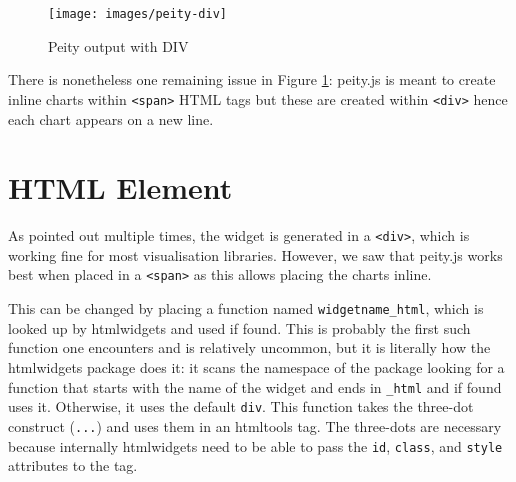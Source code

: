 \documentclass[10pt,]{krantz}
\makeatletter
\newenvironment{Shaded}{\begin{snugshade}}{\end{snugshade}}
\newcommand{\DataTypeTok}[1]{\textcolor[rgb]{0.27,0.27,0.27}{#1}}
\newcommand{\DecValTok}[1]{\textcolor[rgb]{0.06,0.06,0.06}{#1}}
\newcommand{\KeywordTok}[1]{\textcolor[rgb]{0.27,0.27,0.27}{\textbf{#1}}}
\newcommand{\NormalTok}[1]{#1}
\newcommand{\StringTok}[1]{\textcolor[rgb]{0.5,0.5,0.5}{#1}}
\newenvironment{kframe}{%
\medskip{}
\setlength{\fboxsep}{.8em}
 \def\at@end@of@kframe{}%
 \ifinner\ifhmode%
  \def\at@end@of@kframe{\end{minipage}}%
  \begin{minipage}{\columnwidth}%
 \fi\fi%
 \def\FrameCommand##1{\hskip\@totalleftmargin \hskip-\fboxsep
 \colorbox{shadecolor}{##1}\hskip-\fboxsep
     \hskip-\linewidth \hskip-\@totalleftmargin \hskip\columnwidth}%
 \MakeFramed {\advance\hsize-\width
   \@totalleftmargin\z@ \linewidth\hsize
   \@setminipage}}%
 {\par\unskip\endMakeFramed%
 \at@end@of@kframe}
\renewenvironment{Shaded}{\begin{kframe}}{\end{kframe}}
\makeatother
\begin{document}
\begin{Shaded}
\end{Shaded}

\begin{figure}[H]

{\centering \texttt{[image: images/peity-div]} 

}

\caption{Peity output with DIV}\label{fig:peity-divs}
\end{figure}

There is nonetheless one remaining issue in Figure \ref{fig:peity-divs}: peity.js is meant to create inline charts within \texttt{\textless{}span\textgreater{}} HTML tags but these are created within \texttt{\textless{}div\textgreater{}} hence each chart appears on a new line.

\hypertarget{widgets-realistic-html-element}{%
\section{HTML Element}\label{widgets-realistic-html-element}}

As pointed out multiple times, the widget is generated in a \texttt{\textless{}div\textgreater{}}, which is working fine for most visualisation libraries. However, we saw that peity.js works best when placed in a \texttt{\textless{}span\textgreater{}} as this allows placing the charts inline.

This can be changed by placing a function named \texttt{widgetname\_html}, which is looked up by htmlwidgets and used if found. This is probably the first such function one encounters and is relatively uncommon, but it is literally how the htmlwidgets package does it: it scans the namespace of the package looking for a function that starts with the name of the widget and ends in \texttt{\_html} and if found uses it. Otherwise, it uses the default \texttt{div}. This function takes the three-dot construct (\texttt{...}) and uses them in an htmltools tag. The three-dots are necessary because internally htmlwidgets need to be able to pass the \texttt{id}, \texttt{class}, and \texttt{style} attributes to the tag.
\end{document}
